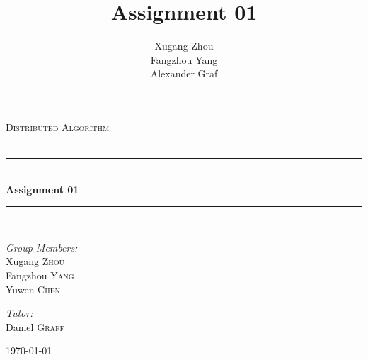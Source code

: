 \documentclass[a4paper, 14pt]{article}
\title{\bf Assignment 01}
\author{Xugang Zhou \\ Fangzhou Yang \\ Alexander Graf}
\newcommand{\HRule}{\rule{\linewidth}{0.5mm}}
\begin{document}
\begin{titlepage}
\begin{center}
\vfill
\textsc{\LARGE Distributed Algorithm}\\[1.5cm]
\textsc{\Large }\\[0.5cm]

\HRule \\[0.4cm]
{\huge \bfseries Assignment 01}\\[0.4cm]
\HRule \\[1.5cm]
\begin{minipage}{0.4\textwidth}
\begin{flushleft} \large
\emph{Group Members:}\\
Xugang \textsc{Zhou}\\
Fangzhou \textsc{Yang}\\
Yuwen  \textsc{Chen}
\end{flushleft}
\end{minipage}
\begin{minipage}{0.4\textwidth}
\begin{flushright} \large
\emph{Tutor:} \\
Daniel \textsc{Graff}\\
\end{flushright}
\end{minipage}
\vfill
{\large \today}\\
\end{center}
\end{titlepage}
\thispagestyle{fancy}
\section{}
\end{document}
